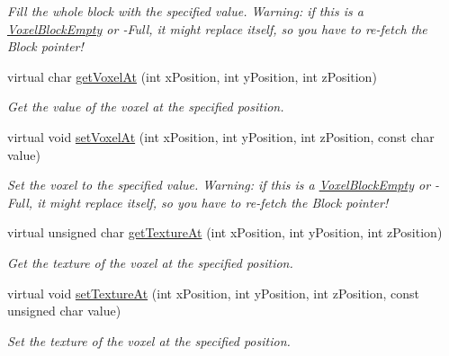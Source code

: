 \begin{DoxyCompactItemize}
\begin{DoxyCompactList}\small\item\em \-Fill the whole block with the specified value. \-Warning\-: if this is a \hyperlink{classVoxelBlockEmpty}{\-Voxel\-Block\-Empty} or -\/\-Full, it might replace itself, so you have to re-\/fetch the \-Block pointer! \end{DoxyCompactList}\item 
\hypertarget{classVoxelBlockPlaceholder_a21e9a2d8d669cc94a82dd42f8be15463}{
virtual char \hyperlink{classVoxelBlockPlaceholder_a21e9a2d8d669cc94a82dd42f8be15463}{get\-Voxel\-At} (int x\-Position, int y\-Position, int z\-Position)}
\label{d0/def/classVoxelBlockPlaceholder_a21e9a2d8d669cc94a82dd42f8be15463}

\begin{DoxyCompactList}\small\item\em \-Get the value of the voxel at the specified position. \end{DoxyCompactList}\item 
\hypertarget{classVoxelBlockPlaceholder_a48557a293c5c61efbaa4232deeac725e}{
virtual void \hyperlink{classVoxelBlockPlaceholder_a48557a293c5c61efbaa4232deeac725e}{set\-Voxel\-At} (int x\-Position, int y\-Position, int z\-Position, const char value)}
\label{d0/def/classVoxelBlockPlaceholder_a48557a293c5c61efbaa4232deeac725e}

\begin{DoxyCompactList}\small\item\em \-Set the voxel to the specified value. \-Warning\-: if this is a \hyperlink{classVoxelBlockEmpty}{\-Voxel\-Block\-Empty} or -\/\-Full, it might replace itself, so you have to re-\/fetch the \-Block pointer! \end{DoxyCompactList}\item 
\hypertarget{classVoxelBlockPlaceholder_a0afb17a9606b2e000acbeb4ddb1a6e0f}{
virtual unsigned char \hyperlink{classVoxelBlockPlaceholder_a0afb17a9606b2e000acbeb4ddb1a6e0f}{get\-Texture\-At} (int x\-Position, int y\-Position, int z\-Position)}
\label{d0/def/classVoxelBlockPlaceholder_a0afb17a9606b2e000acbeb4ddb1a6e0f}

\begin{DoxyCompactList}\small\item\em \-Get the texture of the voxel at the specified position. \end{DoxyCompactList}\item 
\hypertarget{classVoxelBlockPlaceholder_a600a2919a76d47db366d2ddb1bf8754a}{
virtual void \hyperlink{classVoxelBlockPlaceholder_a600a2919a76d47db366d2ddb1bf8754a}{set\-Texture\-At} (int x\-Position, int y\-Position, int z\-Position, const unsigned char value)}
\label{d0/def/classVoxelBlockPlaceholder_a600a2919a76d47db366d2ddb1bf8754a}

\begin{DoxyCompactList}\small\item\em \-Set the texture of the voxel at the specified position. \end{DoxyCompactList}\end{DoxyCompactItemize}
